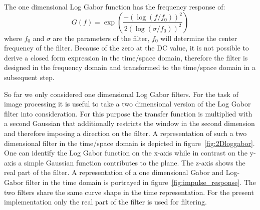 \documentclass[journal]{IEEEtran}
\begin{document}
The one dimensional Log Gabor function has the frequency response of:
\[
	G(f) = \exp\left( \frac{-(\log(f/f_0))^2}{2(\log(\sigma/f_0))^2}\right)
\]
where $f_0$ and $\sigma$ are the parameters of the filter, $f_0$ will determine the center frequency of the filter. Because of the zero at the DC value, it is not possible to derive a closed form expression in the time/space domain, therefore the filter is designed in the frequency domain and transformed to the time/space domain in a subsequent step. 
\par So far we only considered one dimensional Log Gabor filters. For the task of image processing it is useful to take a two dimensional version of the Log Gabor filter into consideration. For this purpose the transfer function is multiplied with a second Gaussian that additionally restricts the window in the second dimension and therefore imposing a direction on the filter. A representation of such a two dimensional filter in the time/space domain is depicted in figure~\ref{fig:2Dloggabor}. One can identify the Log Gabor function on the x-axis while in contrast on the y-axis a simple Gaussian function contributes to the plane. The z-axis shows the real part of the filter. A representation of a one dimensional Gabor and Log-Gabor filter in the time domain is portrayed in figure~\ref{fig:impulse_response}. The two filters share the same curve shape in the time representation. For the present implementation only the real part of the filter is used for filtering.
\end{document}
